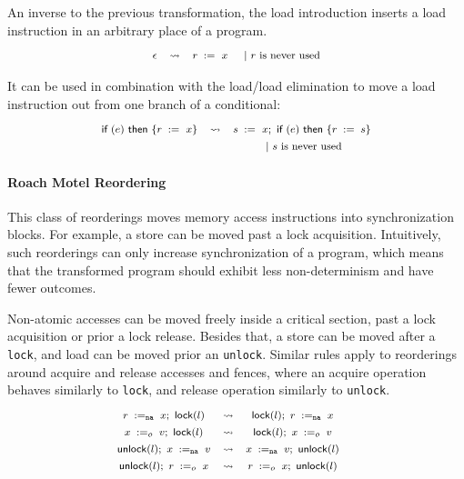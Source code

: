 An inverse to the previous transformation, 
the load introduction inserts a load instruction 
in an arbitrary place of a program.
%
\[\def\arraystretch{1.4}\footnotesize
  \begin{array}{cccl} 

      \epsInst
    & \leadsto 
    & \readInst{}{r}{x} 
    & ~|~ \text{$r$ is never used}  \\ 

  \end{array}
\]

It can be used in combination with the
load/load elimination to move a load 
instruction out from one branch of 
a conditional:
%
\[\def\arraystretch{1.4}\footnotesize
  \begin{array}{ccc} 

      \kw{if} (e)~ \kw{then} \{ \readInst{}{r}{x} \}
    & \leadsto 
    & \readInst{}{s}{x} \seq \kw{if} (e)~ \kw{then} \{ \assignInst{r}{s} \} \\
    & & ~|~ \text{$s$ is never used}  \\ 

  \end{array}
\]

\paragraph{Roach Motel Reordering}

This class of reorderings moves memory access instructions
into synchronization blocks. For example, a store 
can be moved past a lock acquisition. 
Intuitively, such reorderings can only increase 
synchronization of a program, 
which means that the transformed program should 
exhibit less non-determinism and have fewer outcomes. 

Non-atomic accesses can be moved freely inside 
a critical section, \ie past a lock acquisition
or prior a lock release. 
Besides that, a store can be moved after a \texttt{lock}, 
and load can be moved prior an \texttt{unlock}.   
Similar rules apply to reorderings around 
acquire and release accesses and fences, 
where an acquire operation behaves similarly to \texttt{lock}, 
and release operation similarly to \texttt{unlock}.
\[\def\arraystretch{1.4}\footnotesize
  \begin{array}{cccl} 

      \readInst{\na}{r}{x} \seq \lockInst{l} 
    & \leadsto 
    & \lockInst{l} \seq \readInst{\na}{r}{x}
    & ~ \\ 

      \writeInst{o}{x}{v} \seq \lockInst{l} 
    & \leadsto 
    & \lockInst{l} \seq \writeInst{o}{x}{v}
    & ~  \\ 

      \unlockInst{l} \seq \writeInst{\na}{x}{v} 
    & \leadsto 
    & \writeInst{\na}{x}{v} \seq \unlockInst{l}
    & ~ \\ 


      \unlockInst{l} \seq \readInst{o}{r}{x} 
    & \leadsto 
    & \readInst{o}{r}{x} \seq \unlockInst{l}
    & ~  \\ 

  \end{array}
\]


